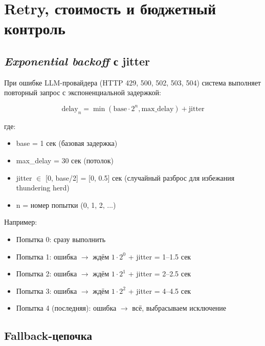 \section{Retry, стоимость и бюджетный контроль}

\label{sec:retry_budget}


\subsection{\emph{Exponential backoff} с jitter}


При ошибке LLM-провайдера (HTTP 429, 500, 502, 503, 504) система выполняет повторный запрос с экспоненциальной задержкой:

\begin{equation}
\text{delay}_n = \min\left(\text{base} \cdot 2^n, \text{max\_delay}\right) + \text{jitter}
\end{equation}

где:
\begin{itemize}[nosep]
\item base = 1 сек (базовая задержка)
\item max\_delay = 30 сек (потолок)
\item jitter $\in$ [0, base/2] = [0, 0.5] сек (случайный разброс для избежания thundering herd)
\item n = номер попытки (0, 1, 2, ...)
\end{itemize}

Например:
\begin{itemize}[nosep]
\item Попытка 0: сразу выполнить
\item Попытка 1: ошибка $\to$ ждём $1 \cdot 2^0$ + jitter = 1--1.5 сек
\item Попытка 2: ошибка $\to$ ждём $1 \cdot 2^1$ + jitter = 2--2.5 сек
\item Попытка 3: ошибка $\to$ ждём $1 \cdot 2^2$ + jitter = 4--4.5 сек
\item Попытка 4 (последняя): ошибка $\to$ всё, выбрасываем исключение
\end{itemize}

\subsection{Fallback-цепочка}


